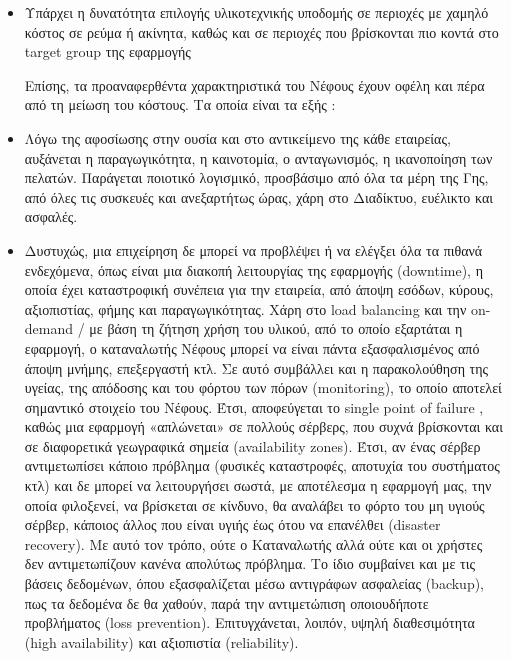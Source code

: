 \documentclass{article}
\begin{document}
\begin{itemize}
\item        Υπάρχει η δυνατότητα επιλογής υλικοτεχνικής υποδομής σε περιοχές με
χαμηλό κόστος σε ρεύμα ή ακίνητα, καθώς και σε περιοχές που βρίσκονται πιο
κοντά στο target group της εφαρμογής


Επίσης, τα προαναφερθέντα χαρακτηριστικά του Νέφους έχουν οφέλη και πέρα
από τη μείωση του κόστους. Τα οποία είναι τα εξής :
\item        Λόγω της αφοσίωσης στην ουσία και στο αντικείμενο της κάθε
εταιρείας, αυξάνεται η παραγωγικότητα, η καινοτομία, ο ανταγωνισμός, η
ικανοποίηση των πελατών. Παράγεται ποιοτικό λογισμικό, προσβάσιμο από όλα
τα μέρη της Γης, από όλες τις συσκευές και ανεξαρτήτως ώρας, χάρη στο
Διαδίκτυο, ευέλικτο και ασφαλές.

\item        Δυστυχώς, μια επιχείρηση δε μπορεί να προβλέψει ή να ελέγξει όλα τα
πιθανά ενδεχόμενα, όπως είναι μια διακοπή λειτουργίας της
εφαρμογής (downtime), η
οποία έχει καταστροφική συνέπεια για την εταιρεία, από άποψη εσόδων,
κύρους, αξιοπιστίας, φήμης και παραγωγικότητας. Χάρη στο
load balancing και την
on-demand / με βάση τη
ζήτηση χρήση του υλικού, από το οποίο εξαρτάται η εφαρμογή, ο καταναλωτής
Νέφους μπορεί να είναι πάντα εξασφαλισμένος από άποψη μνήμης, επεξεργαστή
κτλ. Σε αυτό συμβάλλει και η παρακολούθηση της υγείας, της απόδοσης και
του φόρτου των πόρων (monitoring),
το οποίο αποτελεί σημαντικό στοιχείο του Νέφους.
Έτσι, αποφεύγεται το single point of failure
, καθώς μια εφαρμογή «απλώνεται» σε πολλούς σέρβερς,
που συχνά βρίσκονται και σε διαφορετικά γεωγραφικά
σημεία (availability zones).
Έτσι, αν ένας σέρβερ αντιμετωπίσει κάποιο πρόβλημα
(φυσικές καταστροφές, αποτυχία του συστήματος κτλ) και δε μπορεί να
λειτουργήσει σωστά, με αποτέλεσμα η εφαρμογή μας, την οποία φιλοξενεί, να
βρίσκεται σε κίνδυνο, θα αναλάβει το φόρτο του μη υγιούς σέρβερ, κάποιος
άλλος που είναι υγιής έως ότου να επανέλθει
(disaster recovery). Με αυτό
τον τρόπο, ούτε ο Καταναλωτής αλλά ούτε και οι χρήστες δεν αντιμετωπίζουν
κανένα απολύτως πρόβλημα. Το ίδιο συμβαίνει και με τις βάσεις δεδομένων,
όπου εξασφαλίζεται μέσω αντιγράφων ασφαλείας
(backup), πως τα δεδομένα δε
θα χαθούν, παρά την αντιμετώπιση οποιουδήποτε προβλήματος
(loss prevention).
Επιτυγχάνεται, λοιπόν, υψηλή διαθεσιμότητα (high
availability) και αξιοπιστία
(reliability).


\end{itemize}
\end{document}
